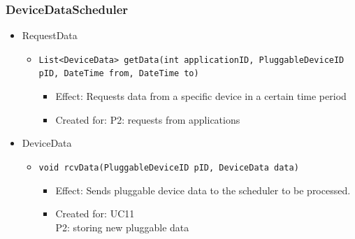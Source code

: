     \subsubsection{DeviceDataScheduler}
        \begin{itemize}
            \item RequestData
            \begin{itemize}
                \item \texttt{List<DeviceData> getData(int applicationID, PluggableDeviceID pID, DateTime from, DateTime to)}
                \begin{itemize}
                    \item Effect: Requests data from a specific device in a certain time period
                    \item Created for: P2: requests from applications
                \end{itemize}
            \end{itemize}

            \item DeviceData
            \begin{itemize}
                \item \texttt{void rcvData(PluggableDeviceID pID, DeviceData data)}
                    \begin{itemize}
                        \item Effect: Sends pluggable device data to the scheduler to be processed.
                        \item Created for: UC11 \\
                              P2: storing new pluggable data
                    \end{itemize}
            \end{itemize}
        \end{itemize}

